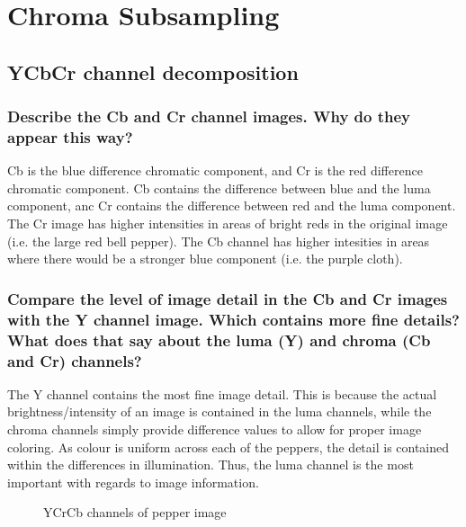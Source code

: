 \section{Chroma Subsampling}


\subsection{YCbCr channel decomposition}

\subsubsection{Describe the Cb and Cr channel images. Why do they appear this way?}

Cb is the blue difference chromatic component, and Cr is the red difference chromatic component. Cb contains the difference between blue and the luma component, anc Cr contains the difference between red and the luma component. The Cr image has higher intensities in areas of bright reds in the original image (i.e. the large red bell pepper). The Cb channel has higher intesities in areas where there would be a stronger blue component (i.e. the purple cloth).

\subsubsection{Compare the level of image detail in the Cb and Cr images with the Y channel image. Which contains more fine details? What does that say about the luma (Y) and chroma (Cb and Cr) channels?}

The Y channel contains the most fine image detail. This is because the actual brightness/intensity of an image is contained in the luma channels, while the chroma channels simply provide difference values to allow for proper image coloring. As colour is uniform across each of the peppers,  the detail is contained within the differences in illumination. Thus, the luma channel is the most important with regards to image information.

\begin{figure}[ht]
\centering
	\caption{YCrCb channels of pepper image}
	\label{fig:noiseGeneration.toy}
\end{figure}
 	
